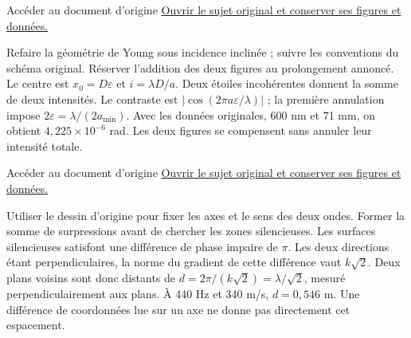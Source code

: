 \begin{loi}{Accéder au document d’origine}
\href{https://mpsi.schleck.ovh/fichiers/devoirs/2025-2026/ds5_molecules_ondes_cinematique.pdf}{Ouvrir le sujet original et conserver ses figures et données.}
\end{loi}
Refaire la géométrie de Young sous incidence inclinée ; suivre les conventions du schéma original. Réserver l’addition des deux figures au prolongement annoncé.
Le centre est $x_0=D\varepsilon$ et $i=\lambda D/a$. Deux étoiles incohérentes donnent la somme de deux intensités. Le contraste est $|\cos(2\pi a\varepsilon/\lambda)|$ ; la première annulation impose $2\varepsilon=\lambda/(2a_{\min})$. Avec les données originales, 600 nm et 71 mm, on obtient $4{,}225\times10^{-6}$ rad. Les deux figures se compensent sans annuler leur intensité totale.

\begin{loi}{Accéder au document d’origine}
\href{https://mpsi.schleck.ovh/fichiers/devoirs/2025-2026/dm5_ondes_chimie.pdf}{Ouvrir le sujet original et conserver ses figures et données.}
\end{loi}
Utiliser le dessin d’origine pour fixer les axes et le sens des deux ondes. Former la somme de surpressions avant de chercher les zones silencieuses.
Les surfaces silencieuses satisfont une différence de phase impaire de $\pi$. Les deux directions étant perpendiculaires, la norme du gradient de cette différence vaut $k\sqrt2$. Deux plans voisins sont donc distants de $d=2\pi/(k\sqrt2)=\lambda/\sqrt2$, mesuré perpendiculairement aux plans. À 440 Hz et 340 m/s, $d=0{,}546$ m. Une différence de coordonnées lue sur un axe ne donne pas directement cet espacement.

